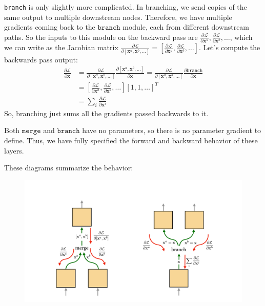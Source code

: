 \texttt{branch} is only slightly more complicated. In branching, we send copies of the same output to multiple downstream nodes. Therefore, we have multiple gradients coming back to the $\texttt{branch}$ module, each from different downstream paths. So the inputs to this module on the backward pass are $\frac{\partial \mathcal{L}}{\partial \mathbf{x}^{a}}, \frac{\partial \mathcal{L}}{\partial \mathbf{x}^{b}}, \ldots$, which we can write as the Jacobian matrix $\frac{\partial \mathcal{L}}{\partial [\mathbf{x}^a, \mathbf{x}^b, \ldots]} = [\frac{\partial \mathcal{L}}{\partial \mathbf{x}^{a}}, \frac{\partial \mathcal{L}}{\partial \mathbf{x}^{b}}, \ldots]$.  Let's compute the backwards pass output:
\begin{align}
    \frac{\partial \mathcal{L}}{\partial \mathbf{x}} &= \frac{\partial \mathcal{L}}{\partial [\mathbf{x}^a, \mathbf{x}^b, \ldots]} \frac{\partial [\mathbf{x}^a, \mathbf{x}^b, \ldots]}{\partial \mathbf{x}} = \frac{\partial \mathcal{L}}{\partial [\mathbf{x}^a, \mathbf{x}^b, \ldots]} \frac{\partial \texttt{branch}}{\partial \mathbf{x}}\\
    &= [\frac{\partial \mathcal{L}}{\partial \mathbf{x}^{a}}, \frac{\partial \mathcal{L}}{\partial \mathbf{x}^{b}}, \ldots][1, 1, \ldots]^T\\
    &= \sum_{i} \frac{\partial \mathcal{L}}{\partial \mathbf{x}^{i}}
\end{align}
So, branching just sums all the gradients passed backwards to it.

Both $\texttt{merge}$ and $\texttt{branch}$ have no parameters, so there is no parameter gradient to define. Thus, we have fully specified the forward and backward behavior of these layers. 

These diagrams summarize the behavior:
\begin{figure}[h]
    \centering
    \includegraphics[width=0.75\linewidth]{./figures/backpropagation/branch_merge_gradient_diagrams.pdf}
    \label{fig:backprop_branch_merge_gradient_diagrams}
\end{figure}

